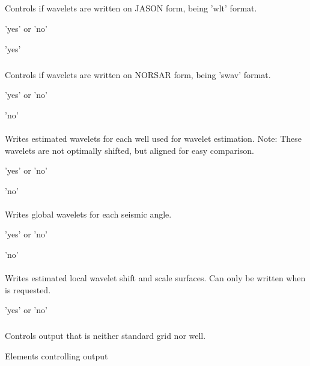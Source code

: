 \subparagraph{}
 \slist
   \item \Description Controls if wavelets are written on JASON form, being 'wlt' format.
   \item \Argument 'yes' or 'no'
   \item \Default 'yes'
 \elist

 \subparagraph{}
 \slist
   \item \Description Controls if wavelets are written on NORSAR form, being 'swav' format.
   \item \Argument 'yes' or 'no'
   \item \Default 'no'
 \elist

\paragraph{}
 \slist
   \item \Description Writes estimated wavelets for each well used for wavelet estimation. Note: These wavelets are not optimally shifted, but aligned for easy comparison.
	\item \Argument 'yes' or 'no'
	\item \Default 'no'
 \elist

\paragraph{}
 \slist
   \item \Description Writes global wavelets for each seismic angle.
	\item \Argument 'yes' or 'no'
	\item \Default 'no'
 \elist

\paragraph{}
 \slist
   \item \Description Writes estimated local wavelet shift and scale surfaces. Can only be written when  is requested.
	\item \Argument 'yes' or 'no'
	\item \Default
 \elist

\subsubsection{}
 \slist
   \item \Description Controls output that is neither standard grid nor well.
   \item \Argument Elements controlling output
   \item \Default
 \elist

